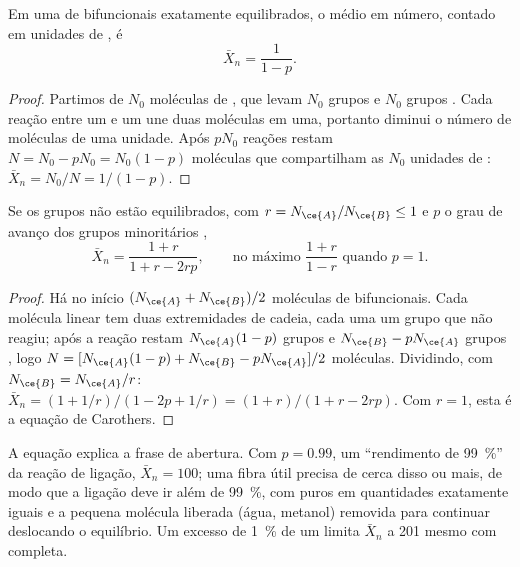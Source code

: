 \begin{theorem}\label{thm:b2:polymer-synthesis:carothers}
Em uma  de  bifuncionais exatamente equilibrados, o  médio em número, contado em unidades de , é
\begin{equation*}
\bar X_n = \frac{1}{1 - p}.
\end{equation*}
\end{theorem}

\begin{proof}
Partimos de $N_0$ moléculas de , que levam $N_0$ grupos  e $N_0$ grupos . Cada
reação entre um  e um  une duas moléculas em uma, portanto diminui o número de moléculas
de uma unidade. Após $pN_0$ reações restam $N = N_0 - pN_0 = N_0(1-p)$ moléculas que compartilham as $N_0$
unidades de : $\bar X_n = N_0/N = 1/(1-p)$.
\end{proof}

\begin{corollary}[Desequilíbrio]\label{cor:b2:polymer-synthesis:imbalance}
Se os grupos não estão equilibrados, com $r = N_{\ce{A}}/N_{\ce{B}} \le 1$ e $p$ o grau de avanço dos
grupos minoritários ,
\begin{equation*}
\bar X_n = \frac{1 + r}{1 + r - 2rp}, \qquad \text{no máximo } \frac{1+r}{1-r} \text{ quando } p = 1.
\end{equation*}
\end{corollary}

\begin{proof}
Há no início $(N_{\ce{A}} + N_{\ce{B}})/2$ moléculas de  bifuncionais. Cada molécula
linear tem duas extremidades de cadeia, cada uma um grupo que não reagiu; após a reação restam $N_{\ce{A}}(1-p)$
grupos  e $N_{\ce{B}} - pN_{\ce{A}}$ grupos , logo $N = [N_{\ce{A}}(1-p) + N_{\ce{B}} -
pN_{\ce{A}}]/2$ moléculas. Dividindo, com $N_{\ce{B}} = N_{\ce{A}}/r$:
$\bar X_n = (1 + 1/r)/(1 - 2p + 1/r) = (1+r)/(1 + r - 2rp)$. Com $r = 1$, esta é a equação de Carothers.
\end{proof}

A equação explica a frase de abertura. Com $p = 0.99$, um ``rendimento de 99~\%'' da reação de ligação, $\bar X_n =
100$; uma fibra útil precisa de cerca disso ou mais, de modo que a ligação deve ir além de 99~\%, com
 puros em quantidades exatamente iguais e a pequena molécula liberada (água, metanol) removida
para continuar deslocando o equilíbrio. Um excesso de 1~\% de um  limita $\bar X_n$ a 201 mesmo
com  completa.

